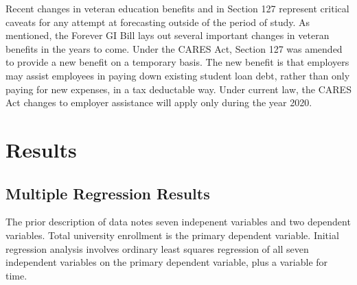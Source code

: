 \documentclass[review]{elsarticle}
\begin{document}
Recent changes in veteran education benefits and in Section 127
represent critical caveats for any attempt at forecasting outside of the period of study.
As mentioned, the Forever GI Bill lays out several important changes in veteran benefits in the years to come.
Under the CARES Act, Section 127 was amended to provide a new benefit on a temporary basis\cite{schiavo_2020}.
The new benefit is that employers may assist employees in paying down existing student loan debt,
rather than only paying for new expenses, in a tax deductable way.
Under current law, the CARES Act changes to employer assistance will apply only during the year 2020.


\section{Results}


\subsection{Multiple Regression Results}
The prior description of data notes seven indepenent variables and two dependent variables.
Total university enrollment is the primary dependent variable.
Initial regression analysis involves ordinary least squares regression of all seven independent variables
on the primary dependent variable,
plus a variable for time.
\end{document}
